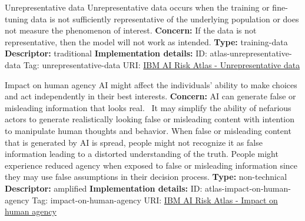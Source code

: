 \documentclass[a4paper,12pt]{article}
\begin{document}
\begin{definitionbox}{Unrepresentative data}
Unrepresentative data occurs when the training or fine-tuning data is not sufficiently representative of the underlying population or does not measure the phenomenon of interest.\newline\newline
\textbf{Concern: }If the data is not representative, then the model will not work as intended.\newline\newline
\textbf{Type: }training-data\newline
\textbf{Descriptor: }traditional \newline\newline
\textbf{Implementation details: } \newline
ID: atlas-unrepresentative-data \newline
Tag: unrepresentative-data \newline
URI:  \href{https://www.ibm.com/docs/en/watsonx/saas?topic=SSYOK8/wsj/ai-risk-atlas/unrepresentative-data.html}{IBM AI Risk Atlas - Unrepresentative data}\newline
\end{definitionbox}
\begin{definitionbox}{Impact on human agency}
AI might affect the individuals' ability to make choices and act independently in their best interests.\newline\newline
\textbf{Concern: }AI can generate false or misleading information that looks real.  It may simplify the ability of nefarious actors to generate realistically looking false or misleading content with intention to manipulate human thoughts and behavior. When false or misleading content that is generated by AI is spread, people might not recognize it as false information leading to a distorted understanding of the truth. People might experience reduced agency when exposed to false or misleading information since they may use false assumptions in their decision process.\newline\newline
\textbf{Type: }non-technical\newline
\textbf{Descriptor: }amplified \newline\newline
\textbf{Implementation details: } \newline
ID: atlas-impact-on-human-agency \newline
Tag: impact-on-human-agency \newline
URI:  \href{https://www.ibm.com/docs/en/watsonx/saas?topic=SSYOK8/wsj/ai-risk-atlas/impact-on-human-agency.html}{IBM AI Risk Atlas - Impact on human agency}\newline
\end{definitionbox}
\end{document}
